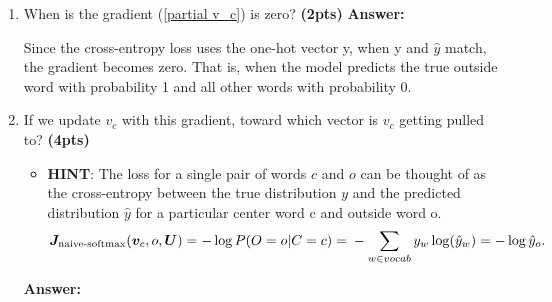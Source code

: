 \documentclass{assignment format}
\newenvironment{answer}{
    {\bf Answer:} \begingroup\color{red}
}{\endgroup}%
\begin{document}
\begin{enumerate}[label=(\alph*)]
	\item When is the gradient (\ref{partial v_c}) is zero? \textbf{(2pts)}
    \begin{answer}
    
Since the cross-entropy loss uses the one-hot vector y, when y and $\hat{y}$ match, the gradient becomes zero. That is, when the model predicts the true outside word with probability 1 and all other words with probability 0.
     
    \end{answer}
    \item  If we update $v_c$ with this gradient, toward which vector is $v_c$ getting pulled to?  \textbf{(4pts)}
    \begin{itemize}
    \item \textbf{HINT}: The loss for a single pair of words $c$ and $o$ can be thought of as the cross-entropy between the true distribution \textbf{$y$} and the predicted distribution \textbf{$\hat{y}$} for a particular center word c and outside word o.
\begin{equation} 
\bm J_{\text{naive-softmax}}(\bm v_c, o, \bm U) = -\log P(O=o| C=c) =\\-\sum_{w \in vocab}y_w\log(\hat{y}_w)=-\log{\hat{y}_o}.
\label{naive-softmax}
\end{equation}

\end{itemize}
  \begin{answer}


\end{answer}
\end{enumerate}
\end{document}
